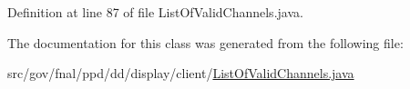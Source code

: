 Definition at line 87 of file List\-Of\-Valid\-Channels.\-java.



The documentation for this class was generated from the following file\-:\begin{DoxyCompactItemize}
\item 
src/gov/fnal/ppd/dd/display/client/\hyperlink{ListOfValidChannels_8java}{List\-Of\-Valid\-Channels.\-java}\end{DoxyCompactItemize}
